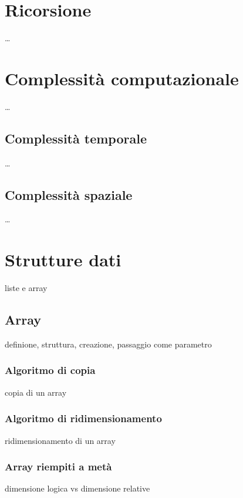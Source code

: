 \documentclass{article}
\begin{document}
\newpage


\section{Ricorsione}
\dots

\section{Complessità computazionale}
\dots

\subsection{Complessità temporale}
\dots

\subsection{Complessità spaziale}
\dots

\newpage

\section{Strutture dati}
liste e array

\subsection{Array}
definione, struttura, creazione, passaggio come parametro

\subsubsection*{Algoritmo di copia}
copia di un array

\subsubsection*{Algoritmo di ridimensionamento}
ridimensionamento di un array

\subsubsection*{Array riempiti a metà}
dimensione logica vs dimensione relative
\end{document}
